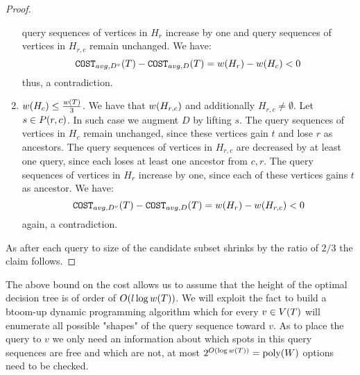 \begin{theorem}
\begin{proof}
\begin{enumerate}
query sequences of vertices in $H_r$ increase by one and query sequences of vertices in $H_{r,c}$ remain unchanged. We have:
$$
\texttt{COST}_{avg, D^v}\mathopen{}\left( T \right)-\texttt{COST}_{avg, D}\mathopen{}\left( T \right)=w\mathopen{}\left( H_r \right)-w\mathopen{}\left( H_c \right)< 0
$$
thus, a contradiction.
\item $w\mathopen{}\left( H_c \right)\leq \frac{w\mathopen{}\left( T \right)}{3}$. We have that $w\mathopen{}\left( H_{r, c} \right)$ and additionally $H_{r, c}\neq\emptyset$. Let $s\in P\mathopen{}\left( r, c \right)$. In such case we augment $D$ by lifting $s$. The query sequences of vertices in
$H_{c}$ remain  unchanged, since these vertices gain $t$ and lose $r$ as ancestors. The query sequences of vertices in $H_{r,c}$ are
decreased by at least one query, since each loses at least one ancestor from ${c, r}$. The query sequences of
vertices in $H_r$ increase by one, since each of these vertices gains $t$ as ancestor. We have:
$$
\texttt{COST}_{avg, D^v}\mathopen{}\left( T \right)-\texttt{COST}_{avg, D}\mathopen{}\left( T \right)=w\mathopen{}\left( H_r \right)-w\mathopen{}\left( H_{r,c} \right)< 0
$$
again, a contradiction.
        \end{enumerate}
As after each query to size of the candidate subset shrinks by the ratio of $2/3$ the claim follows.
    \end{proof}
\end{theorem}
The above bound on the cost allows us to assume that the height of the optimal decision tree is of order of $O\mathopen{}\left( l\log w\mathopen{}\left( T \right) \right)$. We will exploit the fact to build a btoom-up dynamic programming algorithm which for every $v\in V\mathopen{}\left( T \right)$ will enumerate all possible "shapes" of the query sequence toward $v$. As to place the query to $v$ we only need an information about which spots in this query sequences are free and which are not, at most $2^{O\mathopen{}\left( \log w\mathopen{}\left( T \right) \right)}=\text{poly}\mathopen{}\left( W \right)$ options need to be checked. 
